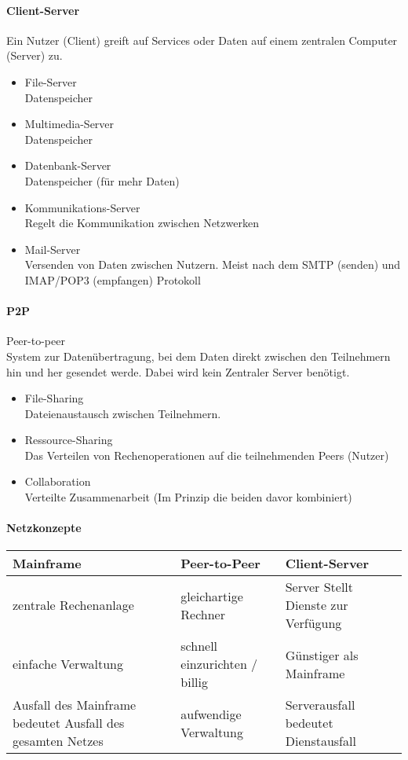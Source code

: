 \documentclass[twocolumn]{article}
\begin{document}
\paragraph{Client-Server}
	Ein Nutzer (Client) greift auf Services oder Daten auf einem zentralen Computer (Server) zu. 
	\begin{itemize}
		\item File-Server \\  Datenspeicher
		\item Multimedia-Server \\ Datenspeicher
		\item Datenbank-Server \\ Datenspeicher (für mehr Daten) 
		\item Kommunikations-Server \\ Regelt die Kommunikation zwischen Netzwerken
		\item Mail-Server \\ Versenden von Daten zwischen Nutzern. Meist nach dem SMTP (senden) und IMAP/POP3 (empfangen) Protokoll     
	\end{itemize}

\paragraph{P2P}
	Peer-to-peer \\
	System zur Datenübertragung, bei dem Daten direkt zwischen den Teilnehmern hin und her gesendet werde. Dabei wird kein Zentraler Server benötigt.
	\begin{itemize}
		\item File-Sharing \\
			Dateienaustausch zwischen Teilnehmern.
		\item Ressource-Sharing \\
			Das Verteilen von Rechenoperationen auf die teilnehmenden Peers (Nutzer)
		\item Collaboration \\
			Verteilte Zusammenarbeit (Im Prinzip die beiden davor kombiniert)
	\end{itemize}

\paragraph{Netzkonzepte\\}
	\begin{tabular}{L{25mm}|L{25mm}|L{25mm}}
		Mainframe \footnotemark  & Peer-to-Peer & Client-Server \\ \hline
		 zentrale Rechenanlage & gleichartige Rechner & Server Stellt Dienste zur Verfügung \\ \hline
		  einfache Verwaltung & schnell einzurichten / billig  & Günstiger als Mainframe \\ \hline
		  Ausfall des Mainframe bedeutet Ausfall des gesamten Netzes & aufwendige Verwaltung & Serverausfall bedeutet Dienstausfall  \\
	\end{tabular}
\end{document}
